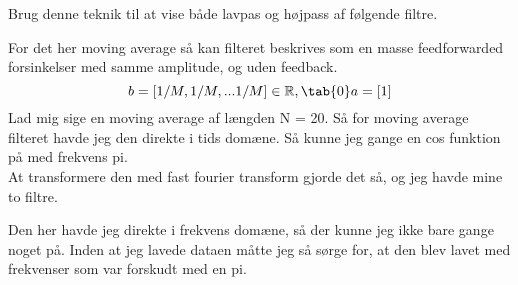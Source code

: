 \begin{Opgaver}
\begin{kapitel}
\begin{Opgave}
            Brug denne teknik til at vise både lavpas og højpass af følgende filtre. 
            \begin{UnderOpgave}[The moving average filter \text{$y[n] = \frac{1}{M} \sum_{k = 0}^{M - 1} x[n - k]$}]
                For det her moving average så kan filteret beskrives som en masse feedforwarded forsinkelser med samme amplitude, og uden feedback.
                \[b = [1/M, 1/M, ... 1/M]\in \mathbb{R}, \tab{0} a = [1]\]
                Lad mig sige en moving average af længden N = 20.
                Så for moving average filteret havde jeg den direkte i tids domæne. Så kunne jeg gange en cos funktion på med frekvens pi. \\
                At transformere den med fast fourier transform gjorde det så, og jeg havde mine to filtre.
            \end{UnderOpgave}
            \begin{UnderOpgave}[\text{$H(z)=\frac{1+1.655z^{-1}+1.655z^{-2}+z^{-3}}{1-1.57z^{-1}+1.264z^{-2}-0.4z^{-3}}$}]
                Den her havde jeg direkte i frekvens domæne, så der kunne jeg ikke bare gange noget på. 
                Inden at jeg lavede dataen måtte jeg så sørge for, at den blev lavet med frekvenser som var forskudt med en pi. 
            \end{UnderOpgave}
            \clearpage


\end{Opgave}
\end{kapitel}
\end{Opgaver}

